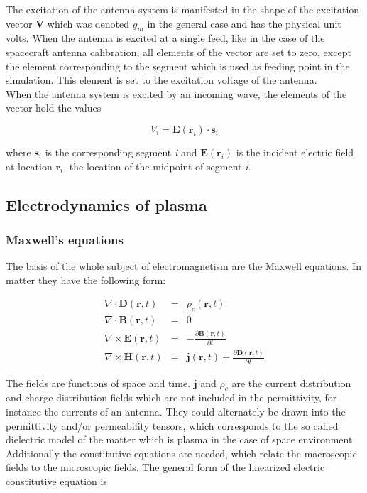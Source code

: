 \documentclass[a4paper,11pt]{article}
\begin{document}
The excitation of the antenna system is manifested in the shape of the excitation vector $\mathbf{V}$ which was denoted $g_m$ in the general case and has the physical unit volts. When the antenna is excited at a single feed, like in the case of the spacecraft antenna calibration, all elements of the vector are set to zero, except the element corresponding to the segment which is used as feeding point in the simulation. This element is set to the excitation voltage of the antenna.\\


When the antenna system is excited by an incoming wave, the elements of the vector hold the values

\begin{equation}
 V_i=\mathbf{E(r_\mathit{i})} \cdot \mathbf{s_\mathit{i}}
\end{equation}

where $\mathbf{s_\mathit{i}}$ is the corresponding segment \textit{i} and $\mathbf{E(r_\mathit{i})}$ is the incident electric field at location $\mathbf{r}_\mathit{i}$, the location of the midpoint of segment \textit{i}.

\subsection{Electrodynamics of plasma}
\subsubsection{Maxwell's equations}
The basis of the whole subject of electromagnetism are the Maxwell
equations. In matter they have the following form:

\begin{eqnarray}
\nabla \cdot \mathbf{D}(\mathbf{r},t)&=&\rho_c(\mathbf{r},t) \label{maxwell1}\\
\nabla \cdot \mathbf{B}(\mathbf{r},t)&=&0 \label{maxwell2} \\
\nabla \times \mathbf{E}(\mathbf{r},t)&=&-\frac{\partial \mathbf{B}(\mathbf{r},t)}{\partial t} \label{maxwell3} \\
\nabla \times \mathbf{H}(\mathbf{r},t)&=&\mathbf{j}(\mathbf{r},t)+ \frac{\partial \mathbf{D}(\mathbf{r},t)}{\partial t} \label{maxwell4}
\end{eqnarray}

The fields are functions of space and time. $\mathbf{j}$ and
$\rho_c$ are the current distribution and charge distribution fields
which are not included in the permittivity, for instance the currents of an antenna. They could alternately be drawn into the permittivity and/or permeability tensors, which corresponds to the so called dielectric model of the matter which is plasma in the case of space environment.
Additionally the constitutive equations are needed, which relate the
macroscopic fields to the microscopic fields. The general form of the linearized electric constitutive equation is
\end{document}
